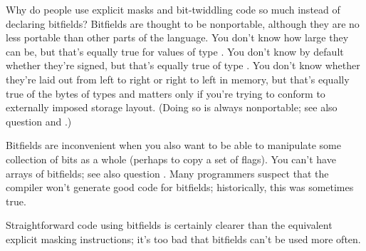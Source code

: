 \begin{faq}
        Why do people use explicit masks and bit-twiddling code so much
        instead of declaring bitfields?
\A
        Bitfields are thought to be nonportable, although they are no less
        portable than other parts of the language. You don't know how large
        they can be, but that's equally true for values of type .
        You don't know by default whether they're signed, but that's equally
        true of type . You don't know whether they're laid out from
        left to right or right to left in memory, but that's equally true of
        the bytes of  types and matters only if you're trying to
        conform to externally imposed storage layout. (Doing so is always
        nonportable; see also question  and .)

        Bitfields are inconvenient when you also want to be able to manipulate
        some collection of bits as a whole (perhaps to copy a set of flags).
        You can't have arrays of bitfields; see also question .
        Many programmers suspect that the compiler won't generate good code
        for bitfields; historically, this was sometimes true.

        Straightforward code using bitfields is certainly clearer than the
        equivalent explicit masking instructions; it's too bad that bitfields
        can't be used more often.
\end{faq}

%
%
